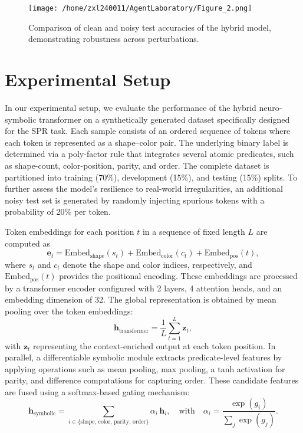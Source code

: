 \documentclass{article}
\begin{document}
\begin{figure}[h]
\caption{Comparison of clean and noisy test accuracies of the hybrid model, demonstrating robustness across perturbations.}
\centering
\texttt{[image: /home/zxl240011/AgentLaboratory/Figure\_2.png]}
\label{fig:fig2}
\end{figure}

\section{Experimental Setup}
In our experimental setup, we evaluate the performance of the hybrid neuro‐symbolic transformer on a synthetically generated dataset specifically designed for the SPR task. Each sample consists of an ordered sequence of tokens where each token is represented as a shape–color pair. The underlying binary label is determined via a poly-factor rule that integrates several atomic predicates, such as shape-count, color-position, parity, and order. The complete dataset is partitioned into training (70\%), development (15\%), and testing (15\%) splits. To further assess the model’s resilience to real-world irregularities, an additional noisy test set is generated by randomly injecting spurious tokens with a probability of 20\% per token.

Token embeddings for each position \(t\) in a sequence of fixed length \(L\) are computed as 
\[
\mathbf{e}_t = \mathrm{Embed}_{\text{shape}}(s_t) + \mathrm{Embed}_{\text{color}}(c_t) + \mathrm{Embed}_{\text{pos}}(t),
\]
where \(s_t\) and \(c_t\) denote the shape and color indices, respectively, and \(\mathrm{Embed}_{\text{pos}}(t)\) provides the positional encoding. These embeddings are processed by a transformer encoder configured with 2 layers, 4 attention heads, and an embedding dimension of 32. The global representation is obtained by mean pooling over the token embeddings:
\[
\mathbf{h}_{\text{transformer}} = \frac{1}{L}\sum_{t=1}^{L}\mathbf{z}_t,
\]
with \(\mathbf{z}_t\) representing the context-enriched output at each token position. In parallel, a differentiable symbolic module extracts predicate-level features by applying operations such as mean pooling, max pooling, a tanh activation for parity, and difference computations for capturing order. These candidate features are fused using a softmax-based gating mechanism:
\[
\mathbf{h}_{\text{symbolic}} = \sum_{i\in\{\text{shape, color, parity, order}\}} \alpha_i\, \mathbf{h}_i,\quad \text{with}\quad \alpha_i = \frac{\exp(g_i)}{\sum_j \exp(g_j)}.
\]
\end{document}
